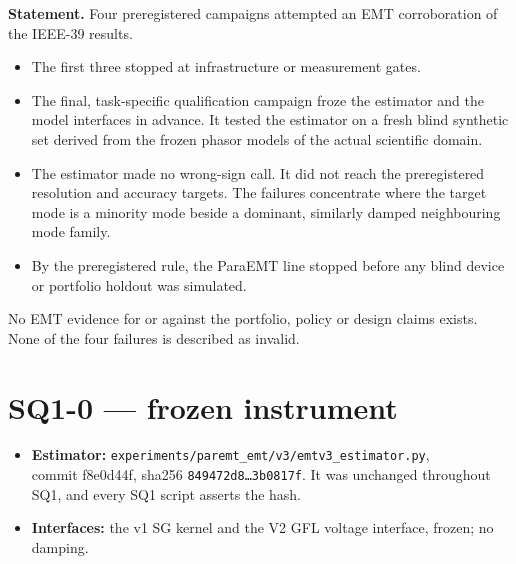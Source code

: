 \documentclass[10pt,a4paper]{article}
\newcommand{\f}[1]{\nolinkurl{#1}}
\begin{document}
\medskip
\noindent\textbf{Statement.} Four preregistered campaigns attempted an EMT corroboration of the IEEE-39 results.
\begin{itemize}
\item The first three stopped at infrastructure or measurement gates.
\item The final, task-specific qualification campaign froze the estimator and the model interfaces in advance.
It tested the estimator on a fresh blind synthetic set derived from the frozen phasor models of the actual scientific domain.
\item The estimator made no wrong-sign call. It did not reach the preregistered resolution and accuracy targets.
The failures concentrate where the target mode is a minority mode beside a dominant, similarly damped neighbouring mode family.
\item By the preregistered rule, the ParaEMT line stopped before any blind device or portfolio holdout was simulated.
\end{itemize}
No EMT evidence for or against the portfolio, policy or design claims exists.
None of the four failures is described as invalid.

\section{SQ1-0 --- frozen instrument}
\begin{itemize}
\item \textbf{Estimator:} \f{experiments/paremt_emt/v3/emtv3_estimator.py},\\
commit f8e0d44f, sha256 \texttt{849472d8\ldots3b0817f}.
It was unchanged throughout SQ1, and every SQ1 script asserts the hash.
\item \textbf{Interfaces:} the v1 SG kernel and the V2 GFL voltage interface, frozen; no damping.
\end{itemize}
\end{document}
